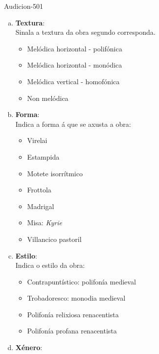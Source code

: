 \begin{defproblem}{Audicion-501}
\begin{ejercicio}[]
\begin{enumerate}[1.-]
\begin{multicols}{2}
\begin{enumerate}[a)]
			\normalsize
		    \item 
		    \textbf{Textura}: \\
		    \small{Sinala a textura da obra segundo corresponda.} \par
			\begin{itemize}
                \item
			     Melódica horizontal - polifónica
                 \item
			     Melódica horizontal - monódica
			     \item
			     Melódica vertical - homofónica
			     \item
				Non melódica
			\end{itemize}
            \normalsize
            \item
			\textbf{Forma}: \\
				\small{Indica a forma á que se axusta a obra:} \par
			\begin{itemize}
			     \item
			     Virelai
			    \item
			     Estampida
			     \item
			     Motete isorrítmico
			     \item
			     Frottola
			     \item
			     Madrigal
			     \item
			     Misa: \emph{Kyrie}
			     \item
			     Villancico pastoril
			\end{itemize}
            \normalsize
		    \item
			\textbf{Estilo}: \\
				\small{Indica o estilo da obra:} \par
			\begin{itemize}
                \item
			     Contrapuntístico: polifonía medieval
                 \item
			     Trobadoresco: monodia medieval
			     \item
			     Polifonía relixiosa renacentista
			     \item
			     Polifonía profana renacentista
			\end{itemize}
            \normalsize
		    \item
			\textbf{Xénero}: \\

\end{enumerate}
\end{multicols}
\end{enumerate}
\end{ejercicio}
\end{defproblem}
